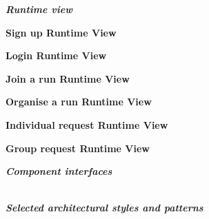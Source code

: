 \begin{legal}
		\item \textit{\textbf{Runtime view}}\\
			\begin{legal}
				\item \textbf{Sign up Runtime View}\\
				\item \textbf{Login Runtime View}\\
				\item \textbf{Join a run Runtime View}\\
				\item \textbf{Organise a run Runtime View}\\
				\item \textbf{Individual request Runtime View}\\
				\item \textbf{Group request Runtime View}\\
			\end {legal}
		\item \textit{\textbf{Component interfaces}}\\\\
		\item \textit{\textbf{Selected architectural styles and patterns}}\\\\
  	\end{legal}
